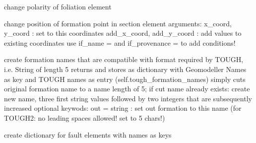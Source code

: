 \documentclass[letterpaper,10pt,english]{sphinxmanual}
\begin{document}
\begin{fulllineitems}
\begin{fulllineitems}
\label{pygeomod:pygeomod.geomodeller_xml_obj.GeomodellerClass.change_foliation_polarity}
change polarity of foliation element

\end{fulllineitems}


\begin{fulllineitems}
\label{pygeomod:pygeomod.geomodeller_xml_obj.GeomodellerClass.change_formation_point_pos}
change position of formation point in section element
arguments:
x\_coord, y\_coord : set to this coordinates
add\_x\_coord, add\_y\_coord : add values to existing coordinates
use if\_name = and if\_provenance = to add conditions!

\end{fulllineitems}


\begin{fulllineitems}
\label{pygeomod:pygeomod.geomodeller_xml_obj.GeomodellerClass.create_TOUGH_formation_names}
create formation names that are compatible with format required by TOUGH,
i.e. String of length 5
returns and stores as dictionary with Geomodeller Names as key and TOUGH names as entry
(self.tough\_formation\_names)
simply cuts original formation name to a name length of 5;
if cut name already exists: create new name, three first string values followed by two integers
that are subsequently increased
optional keywods:
out = string : set out formation to this name (for TOUGH2: no leading spaces allowed! set to 5 chars!)

\end{fulllineitems}


\begin{fulllineitems}
\label{pygeomod:pygeomod.geomodeller_xml_obj.GeomodellerClass.create_fault_dict}
create dictionary for fault elements with names as keys


\end{fulllineitems}
\end{fulllineitems}
\end{document}
